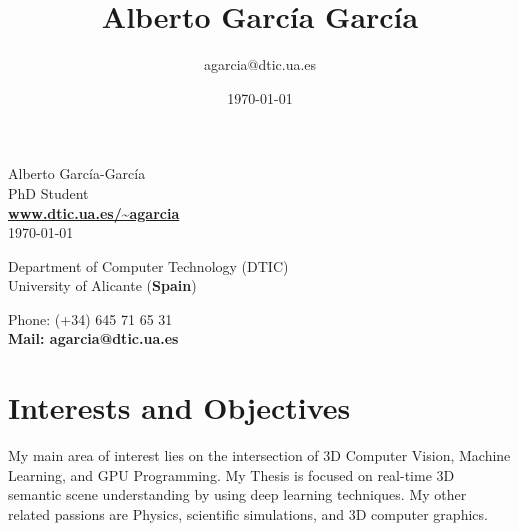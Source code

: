 \documentclass[8pt]{article}
\title{\bfseries\Huge Alberto García García}
\author{agarcia@dtic.ua.es}
\date{\today}
\begin{document}
\begin{center}
	\Huge Alberto García-García\\
	\Large PhD Student\\
	\Large \textbf{\url{www.dtic.ua.es/~agarcia}}\\
	\today
\end{center}
\bigskip
\begin{minipage}[ht]{0.65\textwidth}
Department of Computer Technology (DTIC)\\
University of Alicante (\textbf{Spain})\\
\end{minipage}
\hfill
\begin{minipage}[ht]{0.3\textwidth}
Phone: (+34) 645 71 65 31\\
\textbf{Mail: agarcia@dtic.ua.es}\\
\end{minipage}
 
\section*{Interests and Objectives}

My main area of interest lies on the intersection of 3D Computer Vision, Machine Learning, and GPU Programming. My Thesis is focused on real-time 3D semantic scene understanding by using deep learning techniques. My other related passions are Physics, scientific simulations, and 3D computer graphics.
 
\end{document}
